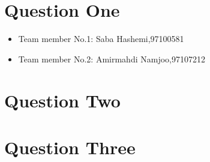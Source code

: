 \documentclass[12pt]{article}
\begin{document}
\section{Question One}

\begin{itemize}
	
	\item Team member No.1: Saba Hashemi,97100581
	\item Team member No.2: Amirmahdi Namjoo,97107212
\end{itemize}

\newpage

\section{Question Two}


\newpage

\section{Question Three}
\end{document}
